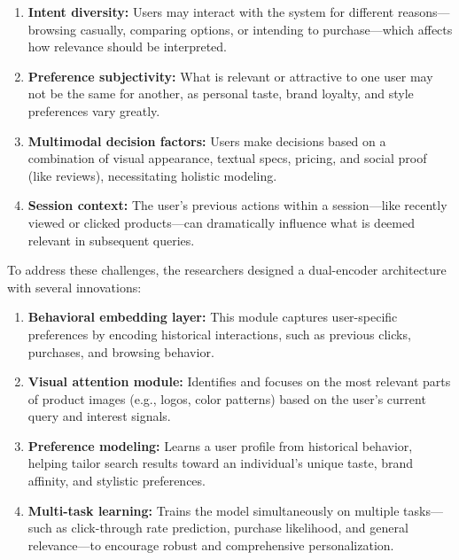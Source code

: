 \documentclass[conference]{IEEEtran}
\begin{document}
\begin{enumerate}
\begin{enumerate}
    \item \textbf{Intent diversity:} Users may interact with the system for different reasons—browsing casually, comparing options, or intending to purchase—which affects how relevance should be interpreted.
    
    \item \textbf{Preference subjectivity:} What is relevant or attractive to one user may not be the same for another, as personal taste, brand loyalty, and style preferences vary greatly.
    
    \item \textbf{Multimodal decision factors:} Users make decisions based on a combination of visual appearance, textual specs, pricing, and social proof (like reviews), necessitating holistic modeling.
    
    \item \textbf{Session context:} The user's previous actions within a session—like recently viewed or clicked products—can dramatically influence what is deemed relevant in subsequent queries.
\end{enumerate}

To address these challenges, the researchers designed a dual-encoder architecture with several innovations:

\begin{enumerate}
    \item \textbf{Behavioral embedding layer:} This module captures user-specific preferences by encoding historical interactions, such as previous clicks, purchases, and browsing behavior.
    
    \item \textbf{Visual attention module:} Identifies and focuses on the most relevant parts of product images (e.g., logos, color patterns) based on the user's current query and interest signals.
    
    \item \textbf{Preference modeling:} Learns a user profile from historical behavior, helping tailor search results toward an individual’s unique taste, brand affinity, and stylistic preferences.
    
    \item \textbf{Multi-task learning:} Trains the model simultaneously on multiple tasks—such as click-through rate prediction, purchase likelihood, and general relevance—to encourage robust and comprehensive personalization.
\end{enumerate}


\end{enumerate}
\end{document}
